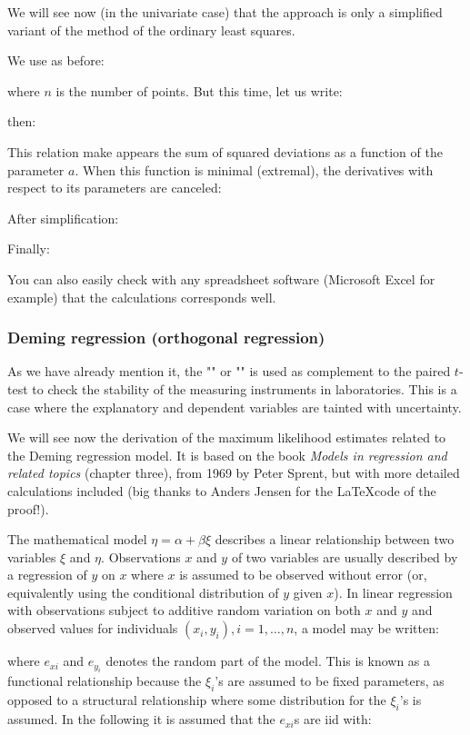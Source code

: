 	We will see now (in the univariate case) that the approach is only a simplified variant of the method of the ordinary least squares.
	
	We use as before:
	
	where $n$ is the number of points. But this time, let us write:
	
	then:	
	
	This relation make appears the sum of squared deviations as a function of the parameter $a$. When this function is minimal (extremal), the derivatives with respect to its parameters are canceled:
	
	After simplification:
	
	Finally:
	
	You can also easily check with any spreadsheet software (Microsoft Excel for example) that the calculations corresponds well.
	
	\pagebreak
	\subsubsection{Deming regression (orthogonal regression)}
	As we have already mention it, the ""  or ""  is used as complement to the paired $t$-test to check the stability of the measuring instruments in laboratories. This is a case where the explanatory and dependent variables are tainted with uncertainty.
	
	We will see now the derivation of the maximum likelihood estimates related to the Deming regression model. It is based on the book \textit{Models in regression and related topics} (chapter three), from 1969 by Peter Sprent, but with more detailed calculations included (big thanks to Anders Jensen for the \LaTeX code of the proof!).

	The mathematical model $\eta=\alpha+\beta\xi$ describes a linear
	relationship between two variables $\xi$ and $\eta$. Observations $x$
	and $y$ of two variables are usually described by a regression of $y$
	on $x$ where $x$ is assumed to be observed without error (or,
	equivalently using the conditional distribution of $y$ given $x$). In
	linear regression with observations subject to additive random
	variation on both $x$ and $y$ and observed values for individuals
	$(x_i,y_i), i=1,\ldots,n$, a model may be written:
	
	where $e_{xi}$ and $e_{y_i}$ denotes the random part of the model.
	This is known as a functional relationship because the $\xi_i$'s are
	assumed to be fixed parameters, as opposed to a structural
	relationship where some distribution for the $\xi_i$'s is assumed. In
	the following it is assumed that the $e_{xi}$s are iid with:
	

